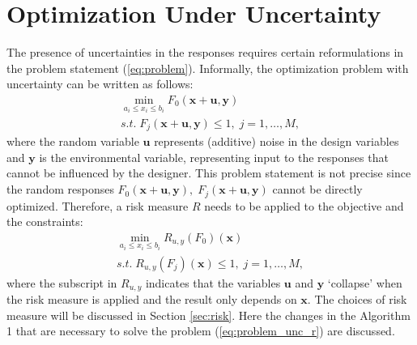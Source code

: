 \documentclass{llncs}
\begin{document}
\section{Optimization Under Uncertainty}

The presence of uncertainties in the responses requires certain reformulations in the problem statement (\ref{eq:problem}). Informally, the optimization problem with uncertainty can be written as follows:
\begin{equation}
  \label{eq:problem_unc}
  \begin{array}{c}
  \min\limits_{a_i \le x_i \le b_i}F_0(\boldsymbol x + \boldsymbol u, \boldsymbol y) \\
  s.t.\; F_j(\boldsymbol x + \boldsymbol u, \boldsymbol y) \le 1,\; j=1,\dots ,M,
  \end{array}
\end{equation}
where the random variable $\boldsymbol u$ represents (additive) noise in the design variables and $\boldsymbol y$ is the environmental variable, representing input to the responses that cannot be influenced by the designer. This problem statement is not precise since the random responses $F_0 (\boldsymbol x+\boldsymbol u,\boldsymbol y),\; F_j (\boldsymbol x+\boldsymbol u,\boldsymbol y)$ cannot be directly optimized. Therefore, a risk measure $R$ needs to be applied to the objective and the constraints:
\begin{equation}
  \label{eq:problem_unc_r}
  \begin{array}{c}
  \min\limits_{a_i \le x_i \le b_i}R_{u,y}(F_0)(\boldsymbol x) \\
  s.t.\; R_{u,y}(F_j)(\boldsymbol x) \le 1,\; j=1,\dots ,M,
  \end{array}
\end{equation}
where the subscript in $R_{u,y}$ indicates that the variables $\boldsymbol u$ and $\boldsymbol y$ ‘collapse’ when the risk measure is applied and the result only depends on $\boldsymbol x$. The choices of risk measure will be discussed in Section \ref{sec:risk}. Here the changes in the Algorithm 1 that are necessary to solve the problem (\ref{eq:problem_unc_r}) are discussed.
\end{document}
